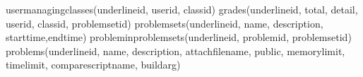 \markdownRendererUlItem user\markdownRendererBackslash{}\markdownRendererUnderscore{}managing\markdownRendererBackslash{}\markdownRendererUnderscore{}classes(\markdownRendererBackslash{}underline\markdownRendererLeftBrace{}id\markdownRendererRightBrace{}, user\markdownRendererBackslash{}\markdownRendererUnderscore{}id, class\markdownRendererBackslash{}\markdownRendererUnderscore{}id)\markdownRendererUlItemEnd 
\markdownRendererUlItem grades(\markdownRendererBackslash{}underline\markdownRendererLeftBrace{}id\markdownRendererRightBrace{}, total, detail, user\markdownRendererBackslash{}\markdownRendererUnderscore{}id, class\markdownRendererBackslash{}\markdownRendererUnderscore{}id, problem\markdownRendererBackslash{}\markdownRendererUnderscore{}set\markdownRendererBackslash{}\markdownRendererUnderscore{}id)\markdownRendererUlItemEnd 
\markdownRendererUlItem problem\markdownRendererBackslash{}\markdownRendererUnderscore{}sets(\markdownRendererBackslash{}underline\markdownRendererLeftBrace{}id\markdownRendererRightBrace{}, name, description, start\markdownRendererBackslash{}\markdownRendererUnderscore{}time,end\markdownRendererBackslash{}\markdownRendererUnderscore{}time)\markdownRendererUlItemEnd 
\markdownRendererUlItem problem\markdownRendererBackslash{}\markdownRendererUnderscore{}in\markdownRendererBackslash{}\markdownRendererUnderscore{}problem\markdownRendererBackslash{}\markdownRendererUnderscore{}sets(\markdownRendererBackslash{}underline\markdownRendererLeftBrace{}id\markdownRendererRightBrace{}, problem\markdownRendererBackslash{}\markdownRendererUnderscore{}id, problem\markdownRendererBackslash{}\markdownRendererUnderscore{}set\markdownRendererBackslash{}\markdownRendererUnderscore{}id)\markdownRendererUlItemEnd 
\markdownRendererUlItem problems(\markdownRendererBackslash{}underline\markdownRendererLeftBrace{}id\markdownRendererRightBrace{}, name, description, attach\markdownRendererBackslash{}\markdownRendererUnderscore{}file\markdownRendererBackslash{}\markdownRendererUnderscore{}name, public, memory\markdownRendererBackslash{}\markdownRendererUnderscore{}limit, time\markdownRendererBackslash{}\markdownRendererUnderscore{}limit, compare\markdownRendererBackslash{}\markdownRendererUnderscore{}script\markdownRendererBackslash{}\markdownRendererUnderscore{}name, build\markdownRendererBackslash{}\markdownRendererUnderscore{}arg)\markdownRendererUlItemEnd 
\markdownRendererUlEndTight \markdownRendererInterblockSeparator
{}\markdownRendererInterblockSeparator
{}\markdownRendererInterblockSeparator
